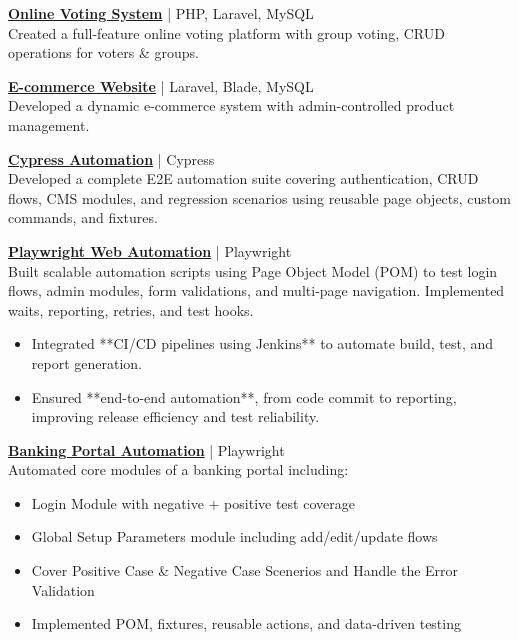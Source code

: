 \documentclass[a4paper,10pt]{article}
\begin{document}
\noindent\textbf{\href{https://github.com/bhimpd/Online-Voting-System}{Online Voting System}} | PHP, Laravel, MySQL \\
Created a full-feature online voting platform with group voting, CRUD operations for voters \& groups.

\noindent\textbf{\href{https://github.com/bhimpd/laravel_2ndecommerce}{E-commerce Website}} | Laravel, Blade, MySQL \\
Developed a dynamic e-commerce system with admin-controlled product management.

\noindent\textbf{\href{https://github.com/bhimpd/toolfix_automation}{Cypress Automation}} | Cypress \\
Developed a complete E2E automation suite covering authentication, CRUD flows, CMS modules, and regression scenarios using reusable page objects, custom commands, and fixtures.

\noindent\textbf{\href{https://github.com/bhimpd/playwright_automation}{Playwright Web Automation}} | Playwright \\
Built scalable automation scripts using Page Object Model (POM) to test login flows, admin modules, form validations, and multi-page navigation. Implemented waits, reporting, retries, and test hooks.  

\begin{itemize}
    \item Integrated **CI/CD pipelines using Jenkins** to automate build, test, and report generation.
    \item Ensured **end-to-end automation**, from code commit to reporting, improving release efficiency and test reliability.
\end{itemize}


\noindent\textbf{\href{https://github.com/bhimpd/Banking-Portal}{Banking Portal Automation}} | Playwright \\
Automated core modules of a banking portal including:
\begin{itemize}
    \item Login Module with negative + positive test coverage
    \item Global Setup Parameters module including add/edit/update flows
    \item Cover Positive Case \& Negative Case Scenerios and Handle the Error Validation
    \item Implemented POM, fixtures, reusable actions, and data-driven testing
\end{itemize}
\end{document}
